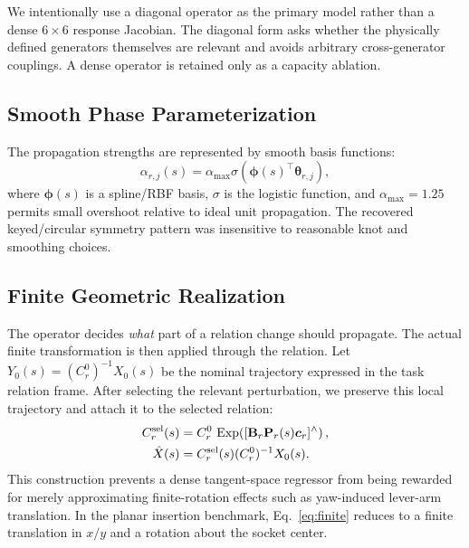 \documentclass[letterpaper,10pt,conference]{ieeeconf}
\DeclareMathOperator{\Exp}{Exp}
\begin{document}
We intentionally use a diagonal operator as the primary model rather than a
dense $6\times6$ response Jacobian. The diagonal form asks whether the
physically defined generators themselves are relevant and avoids arbitrary
cross-generator couplings. A dense operator is retained only as a capacity
ablation.

\subsection{Smooth Phase Parameterization}

The propagation strengths are represented by smooth basis functions:
\begin{equation}
    \alpha_{r,j}(s)
    =
    \alpha_{\max}
    \sigma\!\left(
    \bm\phi(s)^\top\bm\theta_{r,j}
    \right),
    \label{eq:basis}
\end{equation}
where $\bm\phi(s)$ is a spline/RBF basis, $\sigma$ is the logistic function,
and $\alpha_{\max}=1.25$ permits small overshoot relative to ideal unit
propagation. The recovered keyed/circular symmetry pattern was insensitive to
reasonable knot and smoothing choices.

\subsection{Finite Geometric Realization}

The operator decides \emph{what} part of a relation change should propagate.
The actual finite transformation is then applied through the relation. Let
$Y_0(s)=(C_r^0)^{-1}X_0(s)$ be the nominal trajectory expressed in the task
relation frame. After selecting the relevant perturbation, we preserve this
local trajectory and attach it to the selected relation:
\begin{align}
    C_r^{\rm sel}(s)
    &=
    C_r^0\,
    \Exp\!\left(
    [\mathbf B_r\mathbf P_r(s)\bm c_r]^\wedge
    \right),\\
    \hat X(s)
    &=
    C_r^{\rm sel}(s)(C_r^0)^{-1}X_0(s).
    \label{eq:finite}
\end{align}
This construction prevents a dense tangent-space regressor from being rewarded
for merely approximating finite-rotation effects such as yaw-induced lever-arm
translation. In the planar insertion benchmark, Eq.~\eqref{eq:finite} reduces
to a finite translation in $x/y$ and a rotation about the socket center.
\end{document}
